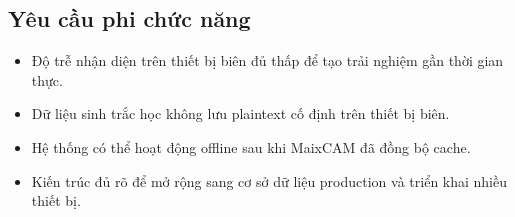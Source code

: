 \subsection{Yêu cầu phi chức năng}
\begin{itemize}
  \item Độ trễ nhận diện trên thiết bị biên đủ thấp để tạo trải nghiệm gần thời gian thực.
  \item Dữ liệu sinh trắc học không lưu plaintext cố định trên thiết bị biên.
  \item Hệ thống có thể hoạt động offline sau khi MaixCAM đã đồng bộ cache.
  \item Kiến trúc đủ rõ để mở rộng sang cơ sở dữ liệu production và triển khai nhiều thiết bị.
\end{itemize}
